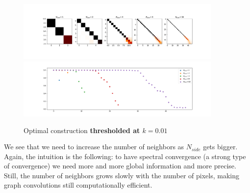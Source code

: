 \begin{figure}[h]
	\label{fig:optimal_thresholded}
	\caption{Optimal construction \textbf{thresholded at $k=0.01$}}
	\centering
	\includegraphics[width=0.9\textwidth]{../codes/02.HeatKernelGraphLaplacian/HEALPix/06_figures/optimal_thresholded.png}	
	\includegraphics[width=0.9\textwidth]{../codes/02.HeatKernelGraphLaplacian/HEALPix/06_figures/optimal_thresholded_diagonal.png}	
\end{figure}

We see that we need to increase the number of neighbors as $N_{side}$ gets bigger. Again, the intuition is the following: to have spectral convergence (a strong type of convergence) we need more and more global information and more precise.  Still, the number of neighbors grows slowly with the number of pixels, making graph convolutions still computationally efficient.

